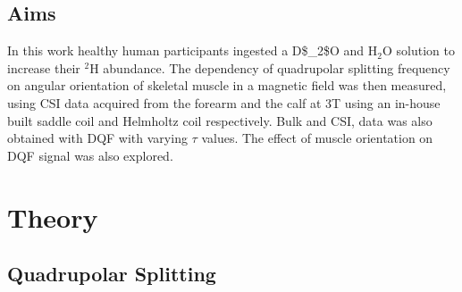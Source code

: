 \subsection{Aims}

In this work healthy human participants ingested a \ac{D$_2$O} and H$_2$O solution to increase their $^2$H abundance. The dependency of quadrupolar splitting frequency on angular orientation of skeletal muscle in a magnetic field was then measured, using \ac{CSI} data acquired from the forearm and the calf at 3T using an in-house built saddle coil and Helmholtz coil respectively. Bulk and \ac{CSI}, data was also obtained with \ac{DQF} with varying $\tau$ values. The effect of muscle orientation on \ac{DQF} signal was also explored.

\section{Theory}
\subsection{Quadrupolar Splitting}

